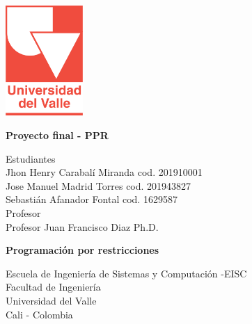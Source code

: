 \begin{titlepage}
    \begin{center}
        \vspace*{1cm}

        \includegraphics[width=0.22\textwidth]{img/universidadDelValle.png}
        
        \vfill
        \textbf{Proyecto final - PPR}\\
        \vfill
        
        Estudiantes\\
        Jhon Henry Carabalí Miranda cod. 201910001\\
        Jose Manuel Madrid Torres cod. 201943827\\
        Sebastián Afanador Fontal cod. 1629587\\
        \vfill
        Profesor\\
        Profesor Juan Francisco Diaz Ph.D.\\
        
        \vfill

        \textbf{Programación por restricciones}
        
        \vfill
           
        Escuela de Ingeniería de Sistemas y Computación -EISC\\
        Facultad de Ingeniería\\
        Universidad del Valle\\
        Cali - Colombia\\
        \vfill
        \date{05 de Agosto del 2022}

    \end{center}
\end{titlepage}